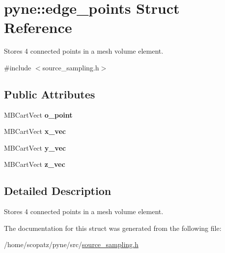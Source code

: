 \hypertarget{structpyne_1_1edge__points}{\section{pyne\-:\-:edge\-\_\-points Struct Reference}
\label{structpyne_1_1edge__points}
}


Stores 4 connected points in a mesh volume element.  




{\ttfamily \#include $<$source\-\_\-sampling.\-h$>$}

\subsection*{Public Attributes}
\begin{DoxyCompactItemize}
\item 
\hypertarget{structpyne_1_1edge__points_a4289acb1ad63358dae33259a58c26eae}{M\-B\-Cart\-Vect {\bfseries o\-\_\-point}}\label{structpyne_1_1edge__points_a4289acb1ad63358dae33259a58c26eae}

\item 
\hypertarget{structpyne_1_1edge__points_abb453892d25c56ff77f81f2d46acfe01}{M\-B\-Cart\-Vect {\bfseries x\-\_\-vec}}\label{structpyne_1_1edge__points_abb453892d25c56ff77f81f2d46acfe01}

\item 
\hypertarget{structpyne_1_1edge__points_a624251a41b0119e753ee5fefc5bdcc88}{M\-B\-Cart\-Vect {\bfseries y\-\_\-vec}}\label{structpyne_1_1edge__points_a624251a41b0119e753ee5fefc5bdcc88}

\item 
\hypertarget{structpyne_1_1edge__points_af38a69fcf9948fd9bd65bcd4ffe3e8c1}{M\-B\-Cart\-Vect {\bfseries z\-\_\-vec}}\label{structpyne_1_1edge__points_af38a69fcf9948fd9bd65bcd4ffe3e8c1}

\end{DoxyCompactItemize}


\subsection{Detailed Description}
Stores 4 connected points in a mesh volume element. 

The documentation for this struct was generated from the following file\-:\begin{DoxyCompactItemize}
\item 
/home/scopatz/pyne/src/\hyperlink{source__sampling_8h}{source\-\_\-sampling.\-h}\end{DoxyCompactItemize}
